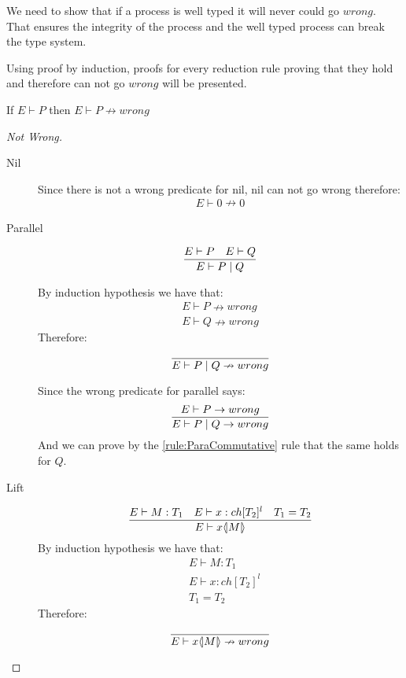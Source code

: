 We need to show that if a process is well typed it will never could go $wrong$. That ensures the integrity of the process and the well typed process can break the type system.

Using proof by induction, proofs for every reduction rule proving that they hold and therefore can not go $wrong$ will be presented.
\begin{theorem}
	If $E \vdash P$ then $E \vdash P \nrightarrow wrong$
\end{theorem}

\begin{proof}[Not Wrong]
	\begin{description}
		\item[Nil]
			Since there is not a wrong predicate for nil, nil can not go wrong therefore:
			\begin{align*}
			E \vdash 0 \nrightarrow 0
			\end{align*}
		\item[Parallel]
			\begin{align*}
			\frac{E \vdash P \quad E \vdash Q }{E \vdash P \mid Q}
			\end{align*}
		 
			By induction hypothesis we have that: 
			\begin{align*}
			E \vdash P \nrightarrow wrong\\
			E \vdash Q \nrightarrow wrong
			\end{align*}
			Therefore:
			\begin{align*}
			\frac{}{E \vdash P \mid Q \nrightarrow wrong}
			\end{align*}
		 
		Since the wrong predicate for parallel says:
		\begin{align*}
		\frac{E \vdash P \rightarrow wrong}{E \vdash P \mid Q \rightarrow wrong}
		\end{align*}
		And we can prove by the \ref{rule:ParaCommutative} rule that the same holds for $Q$.
	\item[Lift]
	    \begin{align*}
	    \frac{E \vdash M:T_1 \quad E \vdash x:ch[T_2]^l \quad T_1 = T_2}{E \vdash x \langle \! | M | \! \rangle}
	    \end{align*}
	    By induction hypothesis we have that:
	    \begin{align*}
	    &E \vdash M:T_1\\
	    &E \vdash x:ch[T_2]^l\\
	    &T_1 = T_2
	    \end{align*}
	    Therefore:
	    \begin{align*}
	    \frac{}{E \vdash x \langle \! | M | \! \rangle \nrightarrow wrong}
	    \end{align*}
	    

\end{description}
\end{proof}
